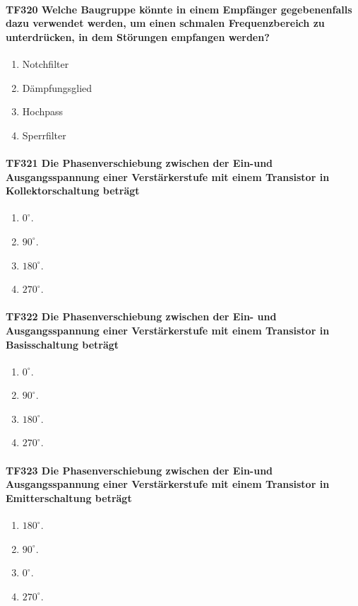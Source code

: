 \documentclass[8pt]{article}
\begin{document}
\paragraph*{TF320 Welche Baugruppe könnte in einem Empfänger gegebenenfalls dazu verwendet werden, um einen schmalen Frequenzbereich zu unterdrücken, in dem Störungen empfangen werden?}
\begin{enumerate}[nolistsep,label=\Alph*]
\item Notchfilter
\item Dämpfungsglied
\item Hochpass
\item Sperrfilter
\end{enumerate}

\paragraph*{TF321 Die Phasenverschiebung zwischen der Ein-und Ausgangsspannung einer Verstärkerstufe mit einem Transistor in Kollektorschaltung beträgt}
\begin{enumerate}[nolistsep,label=\Alph*]
\item $0^{\circ}$.
\item $90^{\circ}$.
\item $180^{\circ}$.
\item $270^{\circ}$.
\end{enumerate}

\paragraph*{TF322 Die Phasenverschiebung zwischen der Ein- und Ausgangsspannung einer Verstärkerstufe mit einem Transistor in Basisschaltung beträgt}
\begin{enumerate}[nolistsep,label=\Alph*]
\item $0^{\circ}$.
\item $90^{\circ}$.
\item $180^{\circ}$.
\item $270^{\circ}$.
\end{enumerate}

\paragraph*{TF323 Die Phasenverschiebung zwischen der Ein-und Ausgangsspannung einer Verstärkerstufe mit einem Transistor in Emitterschaltung beträgt}
\begin{enumerate}[nolistsep,label=\Alph*]
\item $180^{\circ}$.
\item $90^{\circ}$.
\item $0^{\circ}$.
\item $270^{\circ}$.
\end{enumerate}
\end{document}
